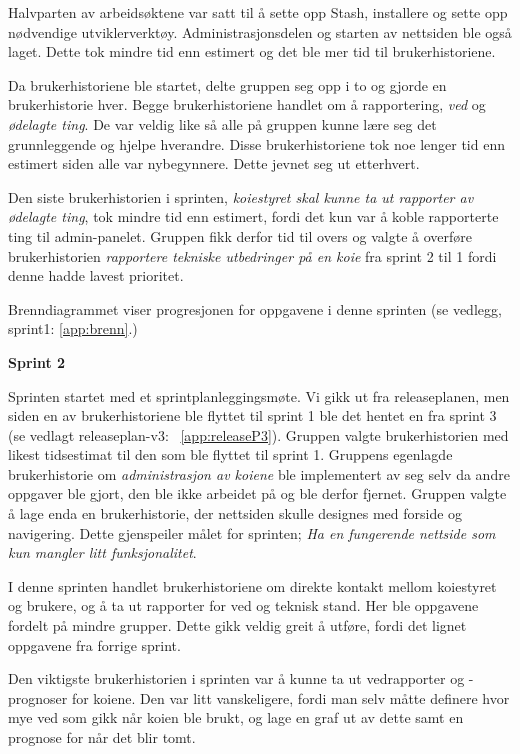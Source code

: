 \documentclass[12pt,a4paper,norsk]{article}
\begin{document}
Halvparten av arbeidsøktene var satt til å sette opp Stash, installere og sette opp nødvendige utviklerverktøy. Administrasjonsdelen og starten av nettsiden ble også laget. Dette tok mindre tid enn estimert og det ble mer tid til brukerhistoriene.

Da brukerhistoriene ble startet, delte gruppen seg opp i to og gjorde en brukerhistorie hver. Begge brukerhistoriene handlet om å rapportering, \textit{ved} og \textit{ødelagte ting}. De var veldig like så alle på gruppen kunne lære seg det grunnleggende og hjelpe hverandre. Disse brukerhistoriene tok noe lenger tid enn estimert siden alle var nybegynnere. Dette jevnet seg ut etterhvert.

Den siste brukerhistorien i sprinten, \textit{koiestyret skal kunne ta ut rapporter av ødelagte ting}, tok mindre tid enn estimert, fordi det kun var å koble rapporterte ting til admin-panelet. Gruppen fikk derfor tid til overs og valgte å overføre brukerhistorien \textit{rapportere tekniske utbedringer på en koie} fra sprint 2 til 1 fordi denne hadde lavest prioritet.

Brenndiagrammet viser progresjonen for oppgavene i denne sprinten (se vedlegg, sprint1: \cref{app:brenn}.)

\bigskip \noindent \textbf{Sprint 2}
\par Sprinten startet med et sprintplanleggingsmøte. Vi gikk ut fra releaseplanen, men siden en av brukerhistoriene ble flyttet til sprint 1 ble det hentet en fra sprint 3 (se vedlagt releaseplan-v3: ~\cref{app:releaseP3}). Gruppen valgte brukerhistorien med likest tidsestimat til den som ble flyttet til sprint 1. Gruppens egenlagde brukerhistorie om \textit{administrasjon av koiene} ble implementert av seg selv da andre oppgaver ble gjort, den ble ikke arbeidet på og ble derfor fjernet. Gruppen valgte å lage enda en brukerhistorie, der nettsiden skulle designes med forside og navigering. Dette gjenspeiler målet for sprinten; \textit{Ha en fungerende nettside som kun mangler litt funksjonalitet}.

I denne sprinten handlet brukerhistoriene om direkte kontakt mellom koiestyret og brukere, og å ta ut rapporter for ved og teknisk stand. Her ble oppgavene fordelt på mindre grupper.
Dette gikk veldig greit å utføre, fordi det lignet oppgavene fra forrige sprint.

Den viktigste brukerhistorien i sprinten var å kunne ta ut vedrapporter og -prognoser for koiene. Den var litt vanskeligere, fordi man selv måtte definere hvor mye ved som gikk når koien ble brukt, og lage en graf ut av dette samt en prognose for når det blir tomt.
\end{document}
